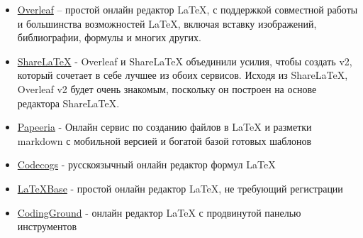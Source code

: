 \documentclass[a4paper,12pt]{article} %
\begin{document}
\begin{itemize}
\item \href{https://overleaf.com/}{Overleaf} – простой онлайн редактор LaTeX, с поддержкой совместной работы и большинства возможностей LaTeX, включая вставку изображений, библиографии, формулы и многих других.
\item \href{https://ru.sharelatex.com/}{ShareLaTeX} - Overleaf и ShareLaTeX объединили усилия, чтобы создать v2, который сочетает в себе лучшее из обоих сервисов. Исходя из ShareLaTeX, Overleaf v2 будет очень знакомым, поскольку он построен на основе редактора ShareLaTeX.
\item \href{https://papeeria.com/}{Papeeria} - Онлайн сервис по созданию файлов в LaTeX и разметки markdown с мобильной версией и богатой базой готовых шаблонов
\item \href{https://www.codecogs.com}{Codecogs} - русскоязычный онлайн редактор формул LaTeX
\item \href{https://latexbase.com}{LaTeXBase} - простой онлайн редактор LaTeX, не требующий регистрации 
\item \href{https://www.tutorialspoint.com/}{CodingGround} - онлайн редактор LaTeX с продвинутой панелью инструментов
\end{itemize}
\end{document}
